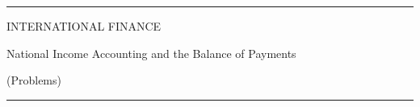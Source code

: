 \documentclass[12pt,aspectratio=169]{beamer}
\begin{document}
\begin{frame}

\begin{center}

\rule{\textwidth}{2pt}

\vskip3mm
INTERNATIONAL FINANCE

National Income Accounting and the Balance of Payments

(Problems)
\rule{\textwidth}{2pt}

\end{center}

\end{frame}


\end{document}
